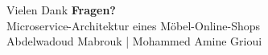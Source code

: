 \documentclass[aspectratio=169,11pt]{beamer}
\begin{document}
\begin{frame}{Vielen Dank}
\centering
\vspace{1cm}
{\Huge \textbf{Fragen?}}\\[.8cm]
{\large Microservice-Architektur eines Möbel-Online-Shops}\\[.25cm]
Abdelwadoud Mabrouk \quad | \quad Mohammed Amine Grioui
\end{frame}
\end{document}
